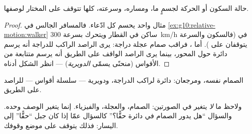 \begin{proposition}\label{prop:g10:relative-motion:relativity}
حالة السكون أو الحركة لجسمٍ ما، ومساره، وسرعته، كلها
تتوقف على  المختار لوصفها.
\end{proposition}

\begin{proof}
مثال واحد يحسم كل ادّعاء. فالمسافر الجالس في
\cref{ex:g10:relative-motion:walker} ساكن في  القطار
ويتحرك بسرعة \qty{300}{km/h} في  (فالسكون والسرعة يتوقفان
على ). أما ، فراقب صمام عجلة دراجة: يرى
الراصد الراكب للدراجة أنه يرسم دائرة حول المحور، بينما
يرى الراصد الواقف على الطريق أنه يرسم متتابعة من الأقواس (منحنًى
يسمّى \emph{الدويرية}) --- انظر الشكل أدناه.
\end{proof}

\begin{omfigure}
\qquad
{}

{\small الصمام نفسه، ومرجعان: دائرة لراكب الدراجة، ودويرية
--- سلسلة أقواس --- للراصد على الطريق.}
\end{omfigure}

\begin{remark}
ولاحظ ما \emph{لا} يتغير في الصورتين: الصمام،
والعجلة، والفيزياء. إنما يتغير الوصف وحده. والسؤال ``هل يدور الصمام
في دائرة حقًّا؟'' كالسؤال عمّا إذا كان جبل
``حقًّا'' إلى اليسار: فذلك يتوقف على موضع وقوفك.
\end{remark}

